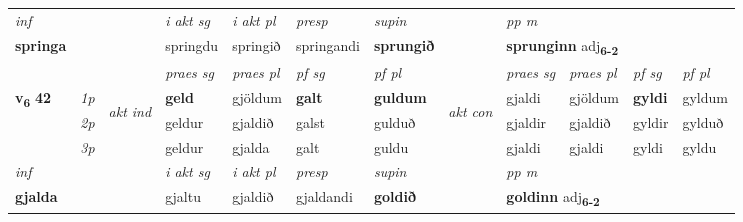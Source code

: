 \begin{longtable}[l]{X>{\footnotesize\itshape}llXXXXlXXXX}
   {\textit{inf}} & &  & \textit{i akt sg} & \textit{i akt pl}   & \textit{presp} & \textit{supin}  && \textit{pp m} \\*
  {\textbf{springa}} & && springdu  & springið   & springandi &  \textbf{sprungið}  && \multicolumn{2}{l}{\textbf{sprunginn} adj\textbf{\textsubscript{6-2}}} \\*

\midrule

 & &   & \textit{praes sg}  & \textit{praes pl}    & \textit{ pf sg} & \textit{pf pl} & & \textit{praes sg}  & \textit{praes pl}    & \textit{pf sg} & \textit{pf pl }  \\ \cmidrule{4-7} \cmidrule{9-12}
 \multirow{2}{*}{{{\textbf{v{\textsubscript{6}}} \Large{\textbf{42}}}}}  & 1p & \multirow{3}{*}{\begin{turn}{90}\textit{akt ind}\end{turn}} & \textbf{geld} & gjöldum & \textbf{galt} & \textbf{guldum} & \multirow{3}{*}{\begin{turn}{90}\textit{akt con}\end{turn}} &gjaldi & gjöldum & \textbf{gyldi} & gyldum\\*
 & 2p &  &  geldur  & gjaldið & galst & gulduð & & gjaldir & gjaldið & gyldir & gylduð \\*
 & 3p &  & geldur & gjalda & galt & guldu & & gjaldi & gjaldi& gyldi & gyldu \\*
\cmidrule{4-7} \cmidrule{9-12}

   {\textit{inf}} & &  & \textit{i akt sg} & \textit{i akt pl}   & \textit{presp} & \textit{supin}  && \textit{pp m} \\*
  {\textbf{gjalda}} & && gjaltu  & gjaldið   & gjaldandi &  \textbf{goldið}  && \multicolumn{2}{l}{\textbf{goldinn} adj\textbf{\textsubscript{6-2}}} \\*

\midrule


\end{longtable}
